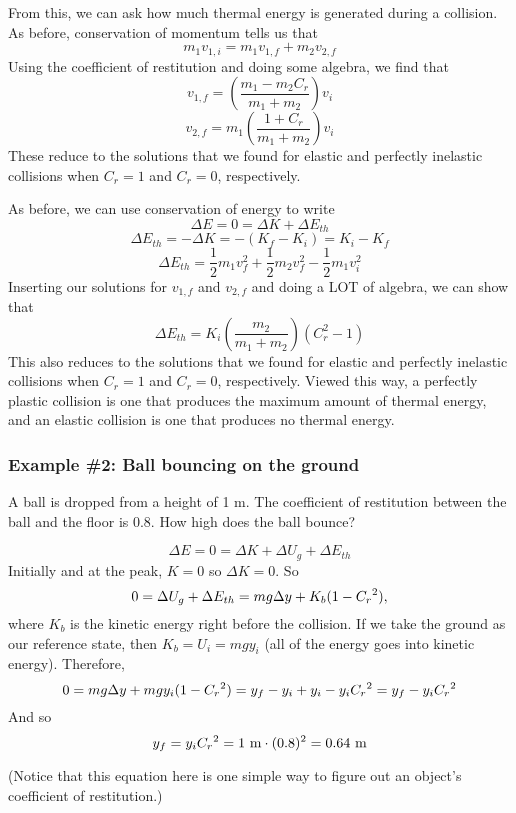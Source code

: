 From this, we can ask how much thermal energy is generated during a collision. As before, conservation of momentum tells us that
$$m_1v_{1,i} = m_1v_{1,f}+m_2v_{2,f}$$
Using the coefficient of restitution and doing some algebra, we find that
$$\boxed{v_{1,f}=\left(\frac{m_1-m_2C_r}{m_1+m_2}\right)v_i}$$
$$\boxed{v_{2,f}=m_1\left(\frac{1+C_r}{m_1+m_2}\right)v_i}$$
These reduce to the solutions that we found for elastic and perfectly inelastic collisions when $C_r=1$ and $C_r=0$, respectively.

As before, we can use conservation of energy to write
$$\Delta{E}=0=\Delta{K}+\Delta{E_{th}}$$
$$\Delta{E_{th}}=-\Delta{K}=-(K_f-K_i)=K_i-K_f$$
$$\Delta E_{th} = \frac{1}{2}m_1v_f^2+\frac{1}{2}m_2v_f^2-\frac{1}{2}m_1v_i^2$$
Inserting our solutions for $v_{1,f}$ and $v_{2,f}$ and doing a LOT of algebra, we can show that
$$\boxed{\Delta E_{th}=K_i\left(\frac{m_2}{m_1+m_2}\right)\left(C_r^2-1\right)}$$
This also reduces to the solutions that we found for elastic and perfectly inelastic collisions when $C_r=1$ and $C_r=0$, respectively. Viewed this way, a perfectly plastic collision is one that produces the maximum amount of thermal energy, and an elastic collision is one that produces no thermal energy.



\subsubsection{Example \#2: Ball bouncing on the ground}
A ball is dropped from a height of 1 m. The coefficient of restitution between the ball and the floor is 0.8. How high does the ball bounce?

$$\Delta{E}=0=\Delta{K}+\Delta{U_g}+\Delta{E_{th}}$$
Initially and at the peak, $K=0$ so $\Delta{K}=0$. So
$$0=\Delta{U_g}+\Delta{E_{th}}=mg\Delta{y}+K_b(1-C_r\displaystyle^2),$$
where $K_b$ is the kinetic energy right before the collision. If we take the ground as our reference state, then $K_b=U_i=mgy_i$ (all of the energy goes into kinetic energy).  Therefore,
$$0=mg\Delta{y}+mgy_i(1-C_r\displaystyle^2)=y_f-y_i+y_i-y_iC_r\displaystyle^2=y_f-y_iC_r\displaystyle^2$$
And so
$$y_f=y_iC_r\displaystyle^2=1\mbox{ m}\cdot(0.8)^2=0.64\mbox{ m}$$

(Notice that this equation here is one simple way to figure out an object's coefficient of restitution.)





\clearpage
